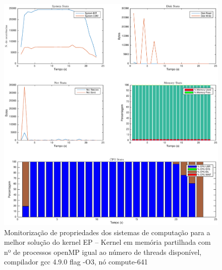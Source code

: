 \documentclass[conference,compsoc]{IEEEtran}
\begin{document}
\begin{figure}
\centering
\includegraphics[width=1\textwidth]{EPS/DSTAT/EP_OMP_24_GCC.eps}
\caption{Monitorização de propriedades dos sistemas de computação para a melhor solução do kernel EP -- Kernel em memória partilhada com nº de processos openMP igual ao número de threads disponível, compilador gcc 4.9.0 flag -O3, nó compute-641}
\label{dstat_ep}
\end{figure}
\end{document}
